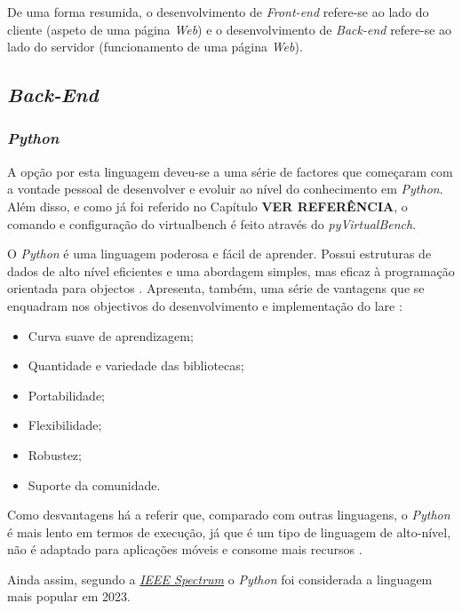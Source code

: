 De uma forma resumida, o desenvolvimento de \textit{Front-end} refere-se ao lado do cliente (aspeto de uma página \textit{Web}) e o desenvolvimento de \textit{Back-end} refere-se ao lado do servidor (funcionamento de uma página \textit{Web}).

\subsection{\textit{Back-End}}
\subsubsection{\textit{Python}}
A opção por esta linguagem deveu-se a uma série de factores que começaram com a vontade pessoal de desenvolver e evoluir ao nível do conhecimento em \textit{Python}. Além disso, e como já foi referido no Capítulo \textbf{VER REFERÊNCIA}, o comando e configuração do \acrshort{virtualbench} é feito através do \textit{pyVirtualBench}.

O \textit{Python} é uma linguagem poderosa e fácil de aprender. Possui estruturas de dados de alto nível eficientes e uma abordagem simples, mas eficaz à programação orientada para objectos \cite{ThePython}. Apresenta, também, uma série de vantagens que se enquadram nos objectivos do desenvolvimento e implementação do \acrshort{lare} \cite{pythonvantagens}:
\begin{itemize}
    \item Curva suave de aprendizagem;
    \item Quantidade e variedade das bibliotecas;
    \item Portabilidade;
    \item Flexibilidade;
    \item Robustez;
    \item Suporte da comunidade.
\end{itemize}

Como desvantagens há a referir que, comparado com outras linguagens, o \textit{Python} é mais lento em termos de execução, já que é um tipo de linguagem de alto-nível, não é adaptado para aplicações móveis e consome mais recursos \cite{pythonvantagens} \cite{5MainDispython}.

Ainda assim, segundo a \textit{\href{https://spectrum.ieee.org/the-top-programming-languages-2023}{\textit{IEEE Spectrum}}} o \textit{Python} foi considerada a linguagem mais popular em 2023.

